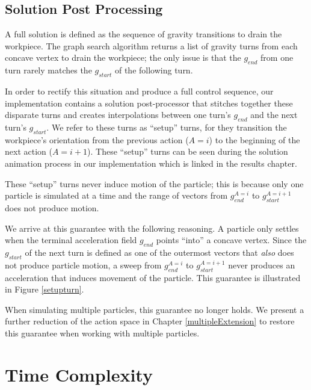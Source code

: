 	\subsection{Solution Post Processing}

A full solution is defined as the sequence of gravity transitions to drain the workpiece. The graph search algorithm returns a list of gravity turns from each concave vertex to drain the workpiece; the only issue is that the $g_{end}$ from one turn rarely matches the $g_{start}$ of the following turn.

In order to rectify this situation and produce a full control sequence, our implementation contains a solution post-processor that stitches together these disparate turns and creates interpolations between one turn's $g_{end}$ and the next turn's $g_{start}$. We refer to these turns as ``setup'' turns, for they transition the workpiece's orientation from the previous action ($A=i$) to the beginning of the next action ($A=i + 1$). These ``setup'' turns can be seen during the solution animation process in our implementation which is linked in the results chapter.

These ``setup'' turns never induce motion of the particle; this is because only one particle is simulated at a time and the range of vectors from $g_{end}^{A=i}$ to $g_{start}^{A=i + 1}$ does not produce motion.

We arrive at this guarantee with the following reasoning. A particle only settles when the terminal acceleration field $g_{end}$ points ``into'' a concave vertex. Since the $g_{start}$ of the next turn is defined as one of the outermost vectors that \emph{also} does not produce particle motion, a sweep from $g_{end}^{A=i}$ to $g_{start}^{A=i + 1}$ never produces an acceleration that induces movement of the particle. This guarantee is illustrated in Figure \ref{setupturn}.

When simulating multiple particles, this guarantee no longer holds. We present a further reduction of the action space in Chapter \ref{multipleExtension} to restore this guarantee when working with multiple particles.


  \section{Time Complexity}


